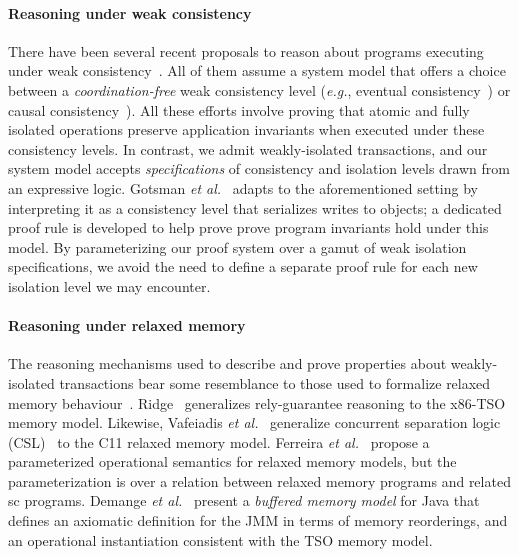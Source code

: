 \vspace*{-4pt}
\paragraph{Reasoning under weak consistency} There have been several
recent proposals to reason about programs executing under weak
consistency~\cite{bailisvldb, alvarocalm, gotsmanpopl16,redblueatc,
  redblueosdi, ecinec}. All of them assume a system model that offers
a choice between a \emph{coordination-free} weak consistency level
(\emph{e.g.}, eventual consistency~\cite{redblueosdi, redblueatc,
  ecinec, alvarocalm, bailisvldb}) or causal
consistency~\cite{lbc16,gotsmanpopl16}). All these efforts involve
proving that atomic and fully isolated operations preserve application
invariants when executed under these consistency levels.  In contrast,
we admit weakly-isolated transactions, and our system model accepts
\emph{specifications} of consistency and isolation levels drawn from
an expressive logic.  Gotsman \emph{et al.}~\cite{gotsmanpopl16}
adapts  to the aforementioned setting
by interpreting it as a consistency level that serializes writes to
objects; a dedicated proof rule is developed to help prove prove
program invariants hold under this model. By parameterizing our proof
system over a gamut of weak isolation specifications, we avoid the
need to define a separate proof rule for each new isolation level we
may encounter.

\vspace*{-4pt}
\paragraph{Reasoning under relaxed memory} The reasoning mechanisms
used to describe and prove properties about weakly-isolated
transactions bear some resemblance to those used to formalize relaxed
memory behaviour~\cite{battycpp}.  Ridge~\cite{rgtso} generalizes
rely-guarantee reasoning to the x86-TSO memory model.  Likewise,
Vafeiadis \emph{et al.}~\cite{rsl13} generalize concurrent separation
logic (CSL)~\cite{csl} to the C11 relaxed memory model.  Ferreira
\emph{et al.}~\cite{ferreira10} propose a parameterized operational
semantics for relaxed memory models, but the parameterization is over
a relation between relaxed memory programs and related {\sc sc}
programs. Demange \emph{et al.}~\cite{DLZ+13} present a \emph{buffered
  memory model} for Java that defines an axiomatic definition for the
JMM in terms of memory reorderings, and an operational instantiation
consistent with the TSO memory model.

